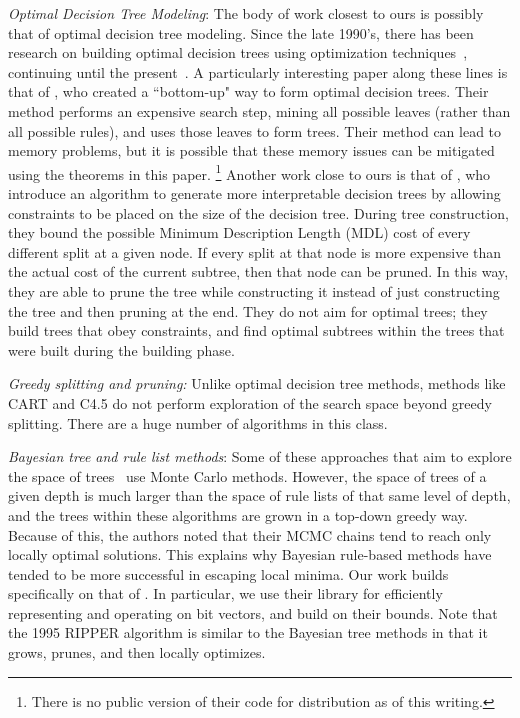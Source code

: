 \textit{Optimal Decision Tree Modeling}: The body of work closest to ours is possibly that of optimal decision tree modeling.
%
Since the late 1990's, there has been research on building optimal decision trees
using optimization techniques~\citep{Bennett96optimaldecision,dobkininduction},
continuing until the present~\citep{FarhangfarGZ08}.
%
A particularly interesting paper along these lines is that of \citet{NijssenFromont2010}, who created a ``bottom-up" way to form optimal decision trees. Their method performs an expensive search step, mining all possible leaves (rather than all possible rules), and uses those leaves to form trees. Their method can lead to memory problems, but it is possible that these memory issues can be mitigated using the theorems in this paper. \footnote{There is no public version of their code for distribution as of this writing.} Another work close to ours is that of \citet{GarofalakisHyRaSh00}, who introduce an algorithm to generate more interpretable decision trees by allowing constraints to be placed on the size of the decision tree. During tree construction, they bound the possible Minimum Description Length (MDL) cost of every different split at a given node. If every split at that node is more expensive than the actual cost of the current subtree, then that node can be pruned. In this way, they are able to prune the tree while constructing it instead of just constructing the tree and then pruning at the end. They do not aim for optimal trees; they build trees that obey constraints, and find optimal subtrees within the trees that were built during the building phase.

\textit{Greedy splitting and pruning:} Unlike optimal decision tree methods, methods like
CART \citep{Breiman84} and C4.5 \citep{Quinlan93} do not perform exploration of the search space beyond greedy splitting. There are a huge number of algorithms in this class.

\textit{Bayesian tree and rule list methods}: Some of these approaches that aim to explore
the space of trees~\citep{Dension:1998hl,Chipman:2002hc,Chipman10} use Monte Carlo methods.
%
However, the space of trees of a given depth is much larger than the space of
rule lists of that same level of depth, and the trees within these algorithms
are grown in a top-down greedy way.
%
Because of this, the authors noted that their MCMC chains tend to reach only
locally optimal solutions.
%
This explains why Bayesian rule-based methods \citep{LethamRuMcMa15,YangRuSe16} have tended to be more successful in escaping local minima.
%
Our work builds specifically on that of \citet{YangRuSe16}.
%
In particular, we use their library for efficiently representing and
operating on bit vectors, and build on their bounds.
%
Note that the 1995 RIPPER algorithm \cite{ripper} is similar to the Bayesian tree methods in that it grows, prunes, and then locally optimizes.

